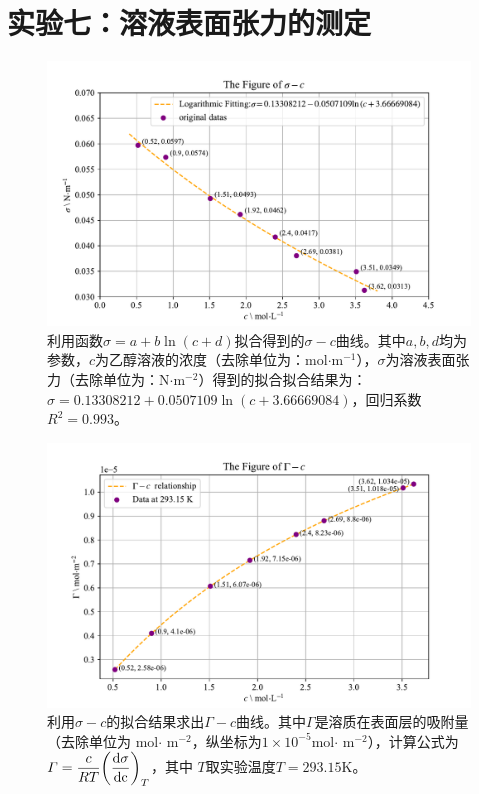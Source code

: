 \documentclass[UTF8,AutoFakeBold,a4paper]{article}
\begin{document}
\section{实验七：溶液表面张力的测定}
\begin{figure}[h]
	\centering
	\includegraphics[scale=0.8]{Figure1}
	\caption{利用函数$\sigma = a + b \ln{(c + d)}$拟合得到的$\sigma - c$曲线。其中$a,b,d$均为参数，$c$为乙醇溶液的浓度（去除单位为：mol$\cdot$m$^{-1}$），$\sigma$为溶液表面张力（去除单位为：N$\cdot$m$^{-2}$）得到的拟合拟合结果为：\textcolor[rgb]{0.54,0.13,0.33}{$ \sigma= 0.13308212+0.0507109\ln{(c + 3.66669084)}$}，回归系数$R^{2} = 0.993$。}
	\label{fi2}
\end{figure}
\begin{figure}[h]
	\centering
	\includegraphics[scale=0.8]{Figure2}
	\caption{利用$\sigma - c$的拟合结果求出$\varGamma - c$曲线。其中$\varGamma$是溶质在表面层的吸附量（去除单位为 mol$\cdot$ m$^{-2}$，纵坐标为$1\times 10^{-5}$mol$\cdot$ m$^{-2}$），计算公式为\textcolor[rgb]{0.07,0.36,0.57}{$\varGamma = \dfrac{c}{RT}\pqty{\dfrac{\rm{d}\sigma}{\rm{d}c}}_{T}$}，其中 $T$取实验温度$T = 293.15$K。}
	\label{fi3}
\end{figure}
\end{document}
